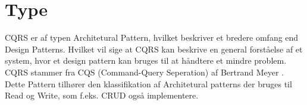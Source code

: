 \section{Type}

CQRS er af typen Architetural Pattern, hvilket beskriver et bredere omfang end Design Patterns. Hvilket vil sige at CQRS kan beskrive en general forståelse af et system, hvor et design pattern kan bruges til at håndtere et mindre problem. CQRS stammer fra CQS (Command-Query Seperation) af Bertrand Meyer \cite{wikipedia-CQS}. 
Dette Pattern tilhører den klassifikation af Architetural patterns der bruges til Read og Write, som f.eks. CRUD også implementere.

